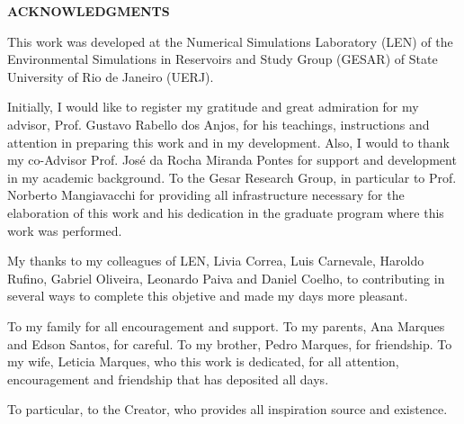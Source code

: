 \begin{center}
\textbf{ACKNOWLEDGMENTS}
\end{center}
$\!$\\

\medskip 
This work was developed at the Numerical Simulations Laboratory (LEN) of the Environmental Simulations in Reservoirs and Study Group (GESAR) of State University of Rio de Janeiro (UERJ).

\medskip 
Initially, I would like to register my gratitude and great admiration for my advisor, Prof. Gustavo Rabello dos Anjos, for his teachings, instructions and attention in preparing this work and in my development.
Also, I would to thank my co-Advisor Prof. José da Rocha Miranda Pontes for support and development in my academic background.
To the Gesar Research Group, in particular to Prof. Norberto Mangiavacchi for providing all infrastructure necessary for the elaboration of this work and his dedication in the graduate program where this work was performed.

\medskip 
My thanks to my colleagues of LEN, Livia Correa, Luis Carnevale, Haroldo Rufino, Gabriel Oliveira, Leonardo Paiva and Daniel Coelho, to contributing in several ways to complete this objetive and made my days more pleasant.

\medskip 
To my family for all encouragement and support. To my parents, Ana Marques and Edson Santos, for careful. To my brother, Pedro Marques, for friendship. To my wife, Leticia Marques, who this work is dedicated, for all attention, encouragement and friendship that has deposited all days.

\medskip 
To particular, to the Creator, who provides all inspiration source and existence.
